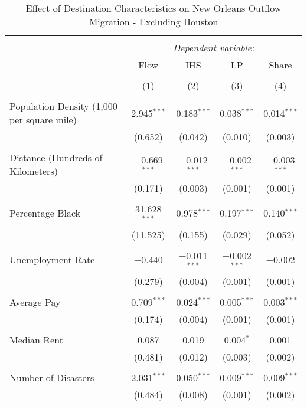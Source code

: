 \documentclass[]{article}
\begin{document}
\begin{table}[!htbp] \centering 
  \caption{\label{reg:regnohor}Effect of Destination Characteristics on New Orleans Outflow Migration - Excluding Houston} 
  \label{} 
\scriptsize 
\begin{tabular}{@{\extracolsep{5pt}}lcccc} 
\\[-1.8ex]\hline 
\hline \\[-1.8ex] 
 & \multicolumn{4}{c}{\textit{Dependent variable:}} \\ 
\cline{2-5} 
 & Flow & IHS & LP & Share \\ 
\\[-1.8ex] & (1) & (2) & (3) & (4)\\ 
\hline \\[-1.8ex] 
 Population Density (1,000 per square mile) & 2.945$^{***}$ & 0.183$^{***}$ & 0.038$^{***}$ & 0.014$^{***}$ \\ 
  & (0.652) & (0.042) & (0.010) & (0.003) \\ 
  & & & & \\ 
 Distance (Hundreds of Kilometers) & $-$0.669$^{***}$ & $-$0.012$^{***}$ & $-$0.002$^{***}$ & $-$0.003$^{***}$ \\ 
  & (0.171) & (0.003) & (0.001) & (0.001) \\ 
  & & & & \\ 
 Percentage Black & 31.628$^{***}$ & 0.978$^{***}$ & 0.197$^{***}$ & 0.140$^{***}$ \\ 
  & (11.525) & (0.155) & (0.029) & (0.052) \\ 
  & & & & \\ 
 Unemployment Rate & $-$0.440 & $-$0.011$^{***}$ & $-$0.002$^{***}$ & $-$0.002 \\ 
  & (0.279) & (0.004) & (0.001) & (0.001) \\ 
  & & & & \\ 
 Average Pay & 0.709$^{***}$ & 0.024$^{***}$ & 0.005$^{***}$ & 0.003$^{***}$ \\ 
  & (0.174) & (0.004) & (0.001) & (0.001) \\ 
  & & & & \\ 
 Median Rent & 0.087 & 0.019 & 0.004$^{*}$ & 0.001 \\ 
  & (0.481) & (0.012) & (0.003) & (0.002) \\ 
  & & & & \\ 
 Number of Disasters & 2.031$^{***}$ & 0.050$^{***}$ & 0.009$^{***}$ & 0.009$^{***}$ \\ 
  & (0.484) & (0.008) & (0.001) & (0.002) \\ 

\end{tabular}
\end{table}
\end{document}
